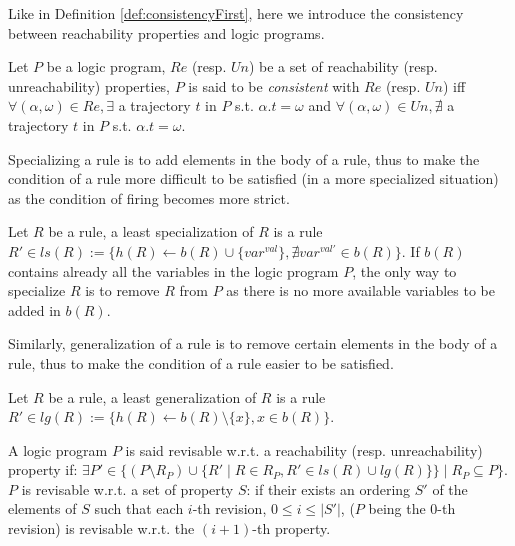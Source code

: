 Like in Definition \ref{def:consistencyFirst}, here we introduce the consistency between reachability properties and logic programs.

\begin{definition}
Let $P$ be a logic program, $Re$ (resp. $Un$) be a set of reachability (resp. unreachability) properties, $P$ is said to be {\em consistent} with $Re$ (resp. $Un$) iff
$\forall (\alpha,\omega) \in Re, \exists$ a trajectory $t$ in $P$ s.t. $\alpha.t=\omega$ and 
$\forall (\alpha,\omega) \in Un, \nexists$ a trajectory $t$ in $P$ s.t. $\alpha.t=\omega$.
\end{definition}

Specializing a rule is to add elements in the body of a rule,
thus to make the condition of a rule more difficult to be satisfied (in a more specialized situation) as the condition of firing becomes more strict.

\begin{definition}
	Let $R$ be a rule, a least specialization of $R$ is a rule $R' \in ls(R) := \{h(R) \leftarrow b(R) \cup \{var^{val}\}, \nexists var^{val'} \in b(R)\}$.
	If $b(R)$ contains already all the variables in the logic program $P$, the only way to specialize $R$ is to remove $R$ from $P$ as there is no more available variables to be added in $b(R)$.
\end{definition}

    Similarly, generalization of a rule is to remove certain elements in the body of a rule, thus to make the condition of a rule easier to be satisfied.

\begin{definition}
	Let $R$ be a rule, a least generalization of $R$ is a rule $R' \in lg(R) := \{h(R) \leftarrow b(R) \setminus \{x\},  x \in b(R)\}$.
\end{definition}

\begin{definition}[Revisable]\label{def:revisable}
	A logic program $P$ is said revisable w.r.t. a reachability (resp. unreachability) property if:
	$\exists P' \in \{(P \setminus R_P) \cup \{R' \mid R \in R_P, R' \in ls(R) \cup lg(R)\} \} \mid R_P \subseteq P\}$.
	$P$ is revisable w.r.t. a set of property $S$:
	if their exists an ordering $S'$ of the elements of $S$ such that each $i$-th revision, $0 \leq i \leq |S'|$, ($P$ being the $0$-th revision) is revisable w.r.t. the $(i+1)$-th property.
\end{definition} 


